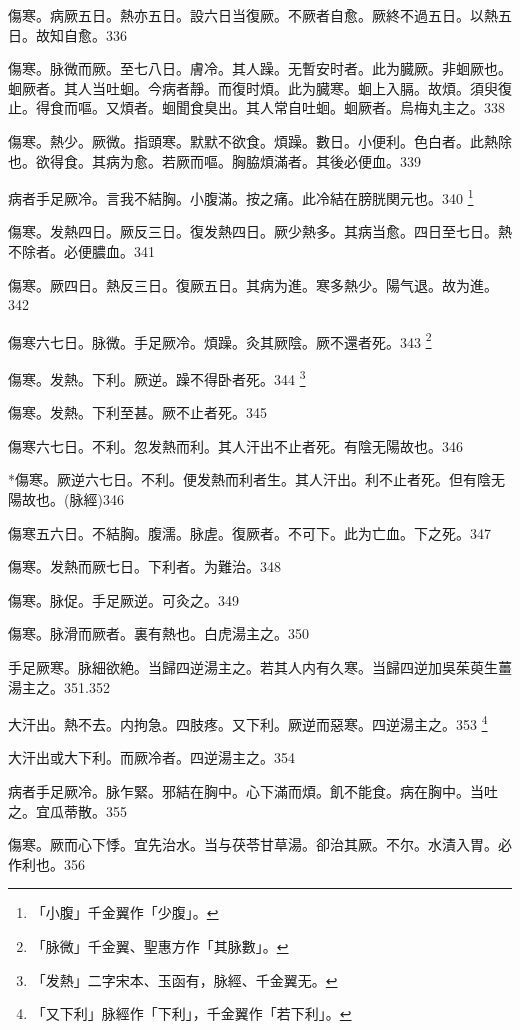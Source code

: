 \documentclass[12pt,twoside,UTF8,b5paper]{ctexbook}
\begin{document}
傷寒。病厥五日。熱亦五日。設六日当復厥。不厥者自愈。厥終不過五日。以熱五日。故知自愈。336

傷寒。脉微而厥。至七八日。膚冷。其人躁。无暫安时者。此为臓厥。非蛔厥也。蛔厥者。其人当吐蛔。今病者靜。而復时煩。此为臓寒。蛔上入膈。故煩。須臾復止。得食而嘔。又煩者。蛔聞食臭出。其人常自吐蛔。蛔厥者。烏梅丸主之。338

傷寒。熱少。厥微。指頭寒。默默不欲食。煩躁。數日。小便利。色白者。此熱除也。欲得食。其病为愈。若厥而嘔。胸脇煩滿者。其後必便血。339

病者手足厥冷。言我不結胸。小腹滿。按之痛。此冷結在膀胱関元也。340
	\footnote{「小腹」千金翼作「少腹」。}

傷寒。发熱四日。厥反三日。復{发}熱四日。厥少熱多。其病当愈。四日至七日。熱不除者。必便膿血。341

傷寒。厥四日。熱反三日。復厥五日。其病为進。寒多熱少。陽气退。故为進。342

傷寒六七日。脉微。手足厥{冷}。煩躁。灸其厥陰。厥不還者死。343
	\footnote{「脉微」千金翼、聖惠方作「其脉數」。}

傷寒。{发熱。}下利。厥逆。躁不得卧者死。344
	\footnote{「发熱」二字宋本、玉函有，脉經、千金翼无。}

傷寒。发熱。下利至{甚。}厥不止者死。345

傷寒六七日。不利。忽发熱而利。其人汗出不止者死。有陰无陽故也。346

*傷寒。厥逆六七日。不利。便发熱而利者生。其人汗出。利不止者死。但有陰无陽故也。(脉經)346

傷寒五六日。不結胸。腹濡。脉虗。復厥者。不可下。此为亡血。{下之}死。347

傷寒。发熱而厥七日。下利者。为難治。348

傷寒。脉促。手足厥逆。可灸之。349

傷寒。脉滑而厥者。裏有熱也。白虎湯主之。350

手足厥寒。脉細欲絶。当歸四逆湯主之。若其人内有久寒。当歸四逆加吳茱萸生薑湯主之。351.352

大汗出。熱不去。内拘急。四肢疼。{又}下利。厥逆而惡寒。四逆湯主之。353
	\footnote{「又下利」脉經作「下利」，千金翼作「若下利」。}

大汗{出}或大下利。而厥冷者。四逆湯主之。354

病者手足厥冷。脉乍緊。邪結在胸中。心下滿而煩。飢不能食。病在胸中。当吐之。宜瓜蒂散。355

傷寒。厥而心下悸。宜先治水。当与茯苓甘草湯。卻治其厥。不尔。水漬入胃。必作利也。356
\end{document}
